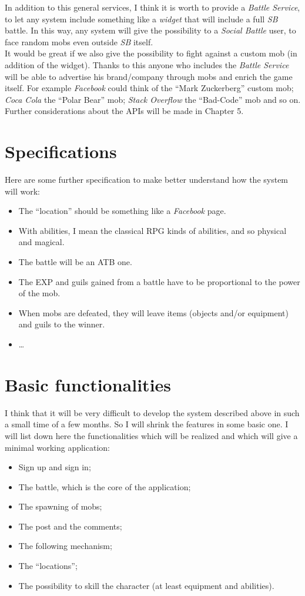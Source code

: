 		In addition to this general services, I think it is worth to provide a \textit{Battle Service}, to let any system 
		include something like a \textit{widget} that will include a full \textit{SB} battle. In this way, any system will give the possibility to a \textit{Social Battle} user, to face random mobs even outside \textit{SB} itself.\\
		It would be great if we also give the possibility to fight against a custom mob (in addition of the widget). Thanks to this anyone who includes the \textit{Battle Service} will be able to advertise his brand/company through mobs and enrich the game itself. For example \textit{Facebook} could think of the ``Mark Zuckerberg'' custom mob; \textit{Coca Cola} the ``Polar Bear'' mob; \textit{Stack Overflow} the ``Bad-Code'' mob and so on.\\

		Further considerations about the APIs will be made in Chapter 5.
	\section{Specifications}
		Here are some further specification to make better understand how the system will work:
		\begin{itemize}
			\item The ``location'' should be something like a \textit{Facebook} page.
			\item With abilities, I mean the classical RPG kinds of abilities, and so physical and magical.
			\item The battle will be an ATB one.
			\item The EXP and guils gained from a battle have to be proportional to the power of the mob.
			\item When mobs are defeated, they will leave items (objects and/or equipment) and guils to the winner.
			\item \ldots
		\end{itemize}

	\section{Basic functionalities}
	I think that it will be very difficult to develop the system described above in such a small time of a few months. So I will shrink the features in some basic one. I will list down here the functionalities which will be realized and which will give a minimal working application:
	\begin{itemize}
		\item Sign up and sign in;
	 	\item The battle, which is the core of the application;
	 	\item The spawning of mobs;
	 	\item The post and the comments;
	 	\item The following mechanism;
	 	\item The ``locations'';
	 	\item The possibility to skill the character (at least equipment and abilities).
	\end{itemize} 